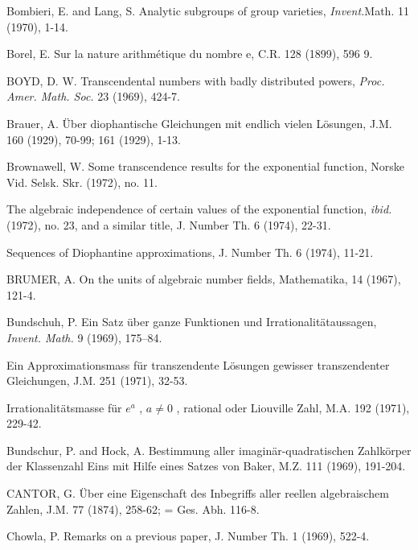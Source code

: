 \begin{hanglist}
    \item Bombieri, E. and Lang, S. Analytic subgroups of group varieties, \textit{Invent.}Math. 11 (1970), 1-14.
    \item Borel, E. Sur la nature arithmétique du nombre e, C.R. 128 (1899), 596 9.
    \item BOYD, D. W. Transcendental numbers with badly distributed powers, \textit{Proc. Amer. Math. Soc.} 23 (1969), 424-7.
    \item Brauer, A. Über diophantische Gleichungen mit endlich vielen Lösungen, J.M. 160 (1929), 70-99; 161 (1929), 1-13.
    \item Brownawell, W. Some transcendence results for the exponential function, Norske Vid. Selsk. Skr. (1972), no. 11.
    \item \hspace{1.5em} The algebraic independence of certain values of the exponential function, \textit{ibid.} (1972), no. 23, and a similar title, J. Number Th. 6 (1974), 22-31.
    \item \hspace{1.5em} Sequences of Diophantine approximations, J. Number Th. 6 (1974), 11-21.
    \item BRUMER, A. On the units of algebraic number fields, Mathematika, 14 (1967), 121-4.
    \item Bundschuh, P. Ein Satz über ganze Funktionen und Irrationalitätaussagen, \textit{Invent. Math.} 9 (1969), 175–84.
    \item Ein Approximationsmass für transzendente Lösungen gewisser transzendenter Gleichungen, J.M. 251 (1971), 32-53.
    \item Irrationalitätsmasse für  $e^a$ ,  $a \neq 0$ , rational oder Liouville Zahl, M.A. 192 (1971), 229-42.
    \item Bundschur, P. and Hock, A. Bestimmung aller imaginär-quadratischen Zahlkörper der Klassenzahl Eins mit Hilfe eines Satzes von Baker, M.Z. 111 (1969), 191-204.
    \item CANTOR, G. Über eine Eigenschaft des Inbegriffs aller reellen algebraischem Zahlen, J.M. 77 (1874), 258-62; = Ges. Abh. 116-8.
    \item Chowla, P. Remarks on a previous paper, J. Number Th. 1 (1969), 522-4.

\end{hanglist}
